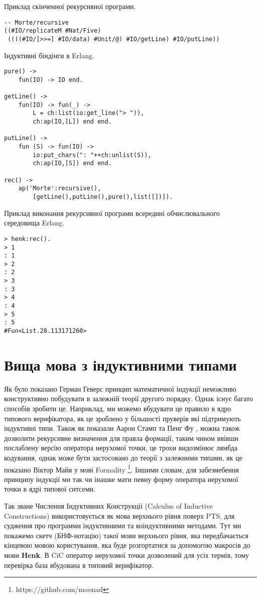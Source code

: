 \documentclass{article}
\begin{document}
Приклад скінченної рекурсивної програми.

\begin{lstlisting}[mathescape=true]
-- Morte/recursive
((#IO/replicateM #Nat/Five)
 ((((#IO/[>>=] #IO/data) #Unit/@) #IO/getLine) #IO/putLine))
\end{lstlisting}

Індуктивні біндінги в Erlang.

\begin{lstlisting}[mathescape=true]
pure() ->
    fun(IO) -> IO end.

getLine() ->
    fun(IO) -> fun(_) ->
        L = ch:list(io:get_line("> ")),
        ch:ap(IO,[L]) end end.

putLine() ->
    fun (S) -> fun(IO) ->
        io:put_chars(": "++ch:unlist(S)),
        ch:ap(IO,[S]) end end.

rec() ->
    ap('Morte':recursive(),
        [getLine(),putLine(),pure(),list([])]).
\end{lstlisting}

Приклад виконання рекурсивної програми всередині обчислювального середовища Erlang.

\begin{lstlisting}[mathescape=true]
> henk:rec().
> 1
: 1
> 2
: 2
> 3
: 3
> 4
: 4
> 5
: 5
#Fun<List.28.113171260>
\end{lstlisting}

\section{Вища мова з індуктивними типами}
Як було показано Герман Геверс\cite{Geuvers01} принцип математичної індукції неможливо конструктивно
побудувати в залежній теорії другого порядку. Однак існує багато способів зробити це. Наприклад,
ми можемо вбудувати це правило в ядро типового верифікатора, як це зроблено у більшості пруверів які підтримують індуктивні типи.
Також як показали Аарон Стамп та Пенг Фу \cite{Stump17}, можна також дозволити рекурсивне визначення для правла формації, таким чином ввівши
послаблену версію оператора нерухомої точки, це трохи видозмінює лямбда кодування, однак може бути застосовано до теорії з
залежними типами, як це показано Віктор Майя у мові Formality \footnote{https://github.com/moonad}.
Іншими словам, для забезмебення принципу індукції ми так чи інашке мати певну форму оператора нерухомої точки в ядрі типової ситсеми.

Так зване Числення Індуктивних Конструкції (Calculus of Inductive Constructions\cite{Mohring15}) використовується як мова верхнього рівня
поверх PTS, для судження про программи індуктивними та коіндуктивними методами.
Тут ми покажемо скетч (БНФ-нотацію) такої мови верхнього рівня, яка передбачається кінцевою мовою користування,
яка буде розгортатися за допомогою макросів до мови \textbf{Henk}.
В CiC оператор нерухомої точки дозволений для усіх термів, тому перевірка база вбудована в типовий верифікатор.
\end{document}
